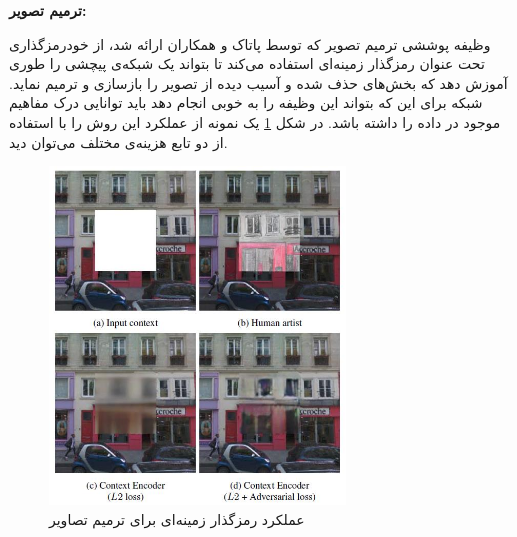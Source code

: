 \noindent\textbf{ترمیم تصویر:}

وظیفه پوششی ترمیم تصویر
که توسط پاتاک و همکاران\cite{pathak2016context}
ارائه شد، از خودرمزگذاری تحت عنوان
رمزگذار زمینه‌ای
استفاده می‌کند تا بتواند یک شبکه‌ی پیچشی را طوری آموزش دهد که بخش‌های حذف شده و آسیب دیده از تصویر را بازسازی و ترمیم نماید. شبکه برای این که بتواند این وظیفه را به خوبی انجام دهد باید توانایی درک مفاهیم موجود در داده را داشته باشد.
در شکل \ref{fig:inpainting-losses}
یک نمونه از عملکرد این روش را با استفاده از دو تابع هزینه‌ی مختلف می‌توان دید.

\begin{figure}[htb!]
\centering
\includegraphics[width=0.7\textwidth]{Images/Chapter2/inpainting-losses.png}
\caption{عملکرد رمزگذار زمینه‌ای برای ترمیم تصاویر}
\label{fig:inpainting-losses}
\end{figure}

